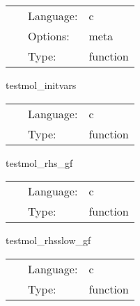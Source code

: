  \begin{tabular*}{160mm}{cll} 
~ & Language:  & c \\ 
~ & Options:  & meta \\ 
~ & Type:  & function \\ 
\end{tabular*} 


\vspace{5mm}


\hspace{5mm} testmol\_initvars 

\hspace{5mm}{\it provide initial data for all variables } 


\hspace{5mm}

 \begin{tabular*}{160mm}{cll} 
~ & Language:  & c \\ 
~ & Type:  & function \\ 
\end{tabular*} 


\vspace{5mm}


\hspace{5mm} testmol\_rhs\_gf 

\hspace{5mm}{\it compute the rhs for the evolved grid function } 


\hspace{5mm}

 \begin{tabular*}{160mm}{cll} 
~ & Language:  & c \\ 
~ & Type:  & function \\ 
\end{tabular*} 


\vspace{5mm}


\hspace{5mm} testmol\_rhsslow\_gf 

\hspace{5mm}{\it compute the rhs for the slow evolved grid function } 


\hspace{5mm}

 \begin{tabular*}{160mm}{cll} 
~ & Language:  & c \\ 
~ & Type:  & function \\ 
\end{tabular*} 


